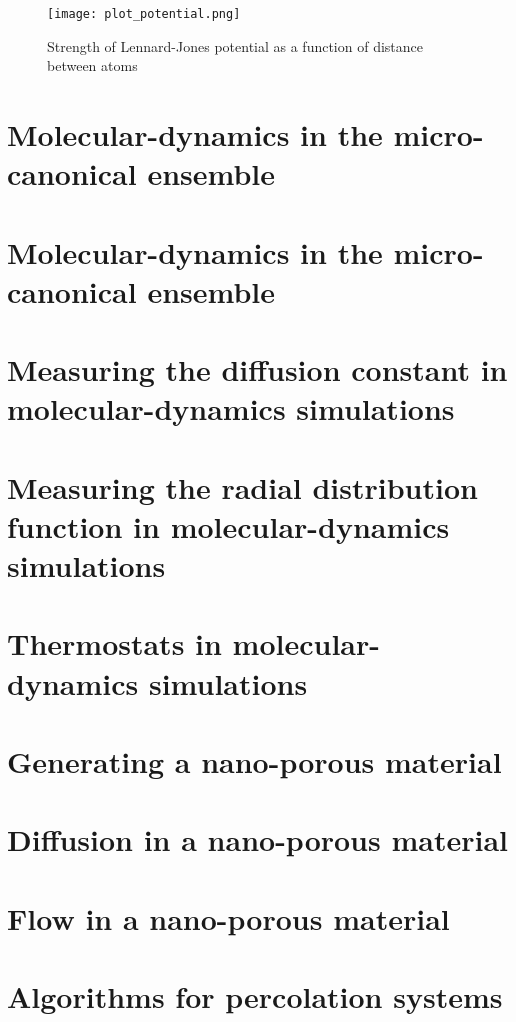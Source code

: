 \documentclass[a4paper,english, 10pt, twoside]{article}
\begin{document}
\begin{figure}[H]
\centering
\texttt{[image: plot\_potential.png]}
\caption{Strength of Lennard-Jones potential as a function of distance between atoms}
\label{LJ_cut}
\end{figure}


\section{Molecular-dynamics in the micro-canonical ensemble}

\section{Molecular-dynamics in the micro-canonical ensemble}

\section{Measuring the diffusion constant in molecular-dynamics simulations}

\section{Measuring the radial distribution function in molecular-dynamics simulations}

\section{Thermostats in molecular-dynamics simulations}

\section{Generating a nano-porous material}

\section{Diffusion in a nano-porous material}

\section{Flow in a nano-porous material}

\section{Algorithms for percolation systems}
\end{document}
